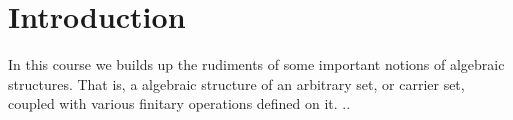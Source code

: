 \section{Introduction} %
\label{sec:introduction}
In this course we builds up the rudiments of some important notions of algebraic structures.
That is, a algebraic structure of an arbitrary set, or carrier set, coupled with various finitary operations defined on it.
..

